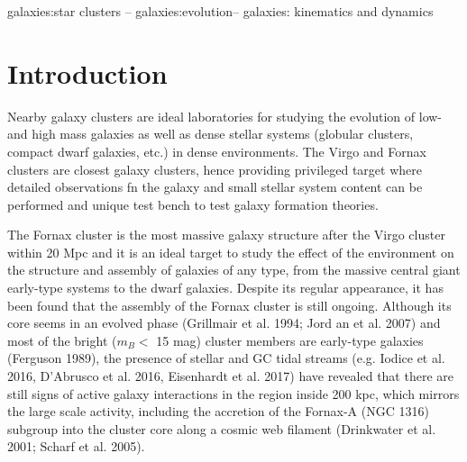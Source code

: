 \documentclass[useAMS,usenatbib]{mn2e}
\begin{document}
\begin{keywords}
galaxies:star clusters -- galaxies:evolution-- galaxies: kinematics and dynamics
\end{keywords}

\section{Introduction}

Nearby galaxy clusters are ideal laboratories for studying the evolution of low- and high mass galaxies as well as dense stellar systems (globular clusters, compact dwarf galaxies, etc.) in dense environments. The Virgo and Fornax clusters are closest galaxy clusters, hence providing privileged target where detailed observations fn the galaxy and small stellar system content can be performed and unique test bench to test galaxy formation theories. 

The Fornax cluster is the most massive galaxy structure after the Virgo cluster within 20 Mpc and it is an ideal target to study the effect of the environment on the structure and assembly of galaxies of any type, from the massive central giant early-type systems to the dwarf galaxies. Despite its regular appearance, it has been found that the assembly of the Fornax cluster is still ongoing. Although its core seems in an evolved phase (Grillmair et al. 1994; Jord an et al. 2007) and most of the bright ($m_B < $  15 mag) cluster members are early-type galaxies (Ferguson 1989), the presence of stellar and GC tidal streams (e.g. Iodice et al. 2016, D’Abrusco et al. 2016, Eisenhardt et al. 2017) have revealed that there are still signs of active galaxy interactions in the region inside 200 kpc, which mirrors the large scale activity, including the accretion of the Fornax-A (NGC 1316) subgroup into the cluster core along a cosmic web filament (Drinkwater et al. 2001; Scharf et al. 2005).
\end{document}
